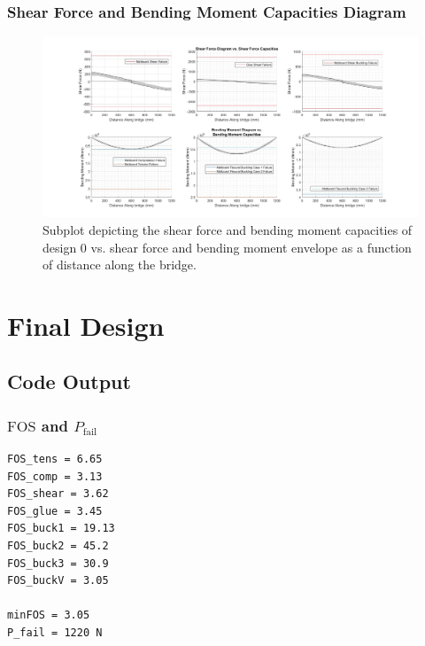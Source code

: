 \documentclass[11pt, fleqn]{article}
\begin{document}
\subsubsection{Shear Force and Bending Moment Capacities Diagram}
\begin{figure}[h]
    \centering
    \includegraphics[width=\linewidth]{../../img/design-0.jpg}
    \caption{Subplot depicting the shear force and bending moment capacities of design 0 vs. shear force and bending moment envelope as a function of distance along the bridge.}
\end{figure}

\section{Final Design}

\subsection{Code Output}

\subsubsection{$\mathrm{FOS}$ and $P_{\mathrm{fail}}$}
\begin{lstlisting}[]
FOS_tens = 6.65
FOS_comp = 3.13
FOS_shear = 3.62
FOS_glue = 3.45
FOS_buck1 = 19.13
FOS_buck2 = 45.2
FOS_buck3 = 30.9
FOS_buckV = 3.05
    
minFOS = 3.05
P_fail = 1220 N    
\end{lstlisting}
\end{document}

